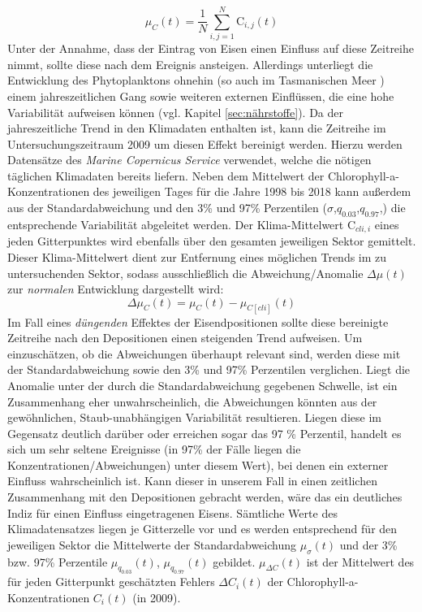 \documentclass[12pt,a4paper,onecolumn,headheight=30pt]{scrartcl}
\begin{document}
\begin{equation}
\mu_C(t) = \frac{1}{N}\sum\limits_{i,j=1}^{N} \text{C}_{i,j}(t)
\end{equation}
Unter der Annahme, dass der Eintrag von Eisen einen Einfluss auf diese Zeitreihe nimmt, sollte diese nach dem Ereignis ansteigen. Allerdings unterliegt die Entwicklung des Phytoplanktons ohnehin (so auch im Tasmanischen Meer \citep{Tilburg.2002}) einem jahreszeitlichen Gang sowie weiteren externen Einflüssen, die eine hohe Variabilität aufweisen können (vgl. Kapitel \ref{sec:nährstoffe}). Da der jahreszeitliche Trend in den Klimadaten enthalten ist, kann die Zeitreihe im Untersuchungszeitraum 2009 um diesen Effekt bereinigt werden. Hierzu werden Datensätze des \textit{Marine Copernicus Service} verwendet, welche die nötigen täglichen Klimadaten bereits liefern. Neben dem Mittelwert der Chlorophyll-a-Konzentrationen des jeweiligen Tages für die Jahre 1998 bis 2018 kann außerdem aus der Standardabweichung und den 3\% und 97\% Perzentilen ($\sigma$,$q_{0.03}$,$q_{0.97}$,) die entsprechende Variabilität abgeleitet werden. Der Klima-Mittelwert $\text{C}_{cli,i}$ eines jeden Gitterpunktes wird ebenfalls über den gesamten jeweiligen Sektor gemittelt. Dieser Klima-Mittelwert dient zur Entfernung eines möglichen Trends im zu untersuchenden Sektor, sodass ausschließlich die Abweichung/Anomalie $\Delta \mu(t)$ zur \textit{normalen} Entwicklung dargestellt wird:
\begin{equation}
\Delta \mu_C(t) = \mu_C(t) - \mu_{C[cli]}(t) \label{eq:cli_anomalie}
\end{equation} 
Im Fall eines \textit{düngenden} Effektes der Eisendpositionen sollte diese bereinigte Zeitreihe nach den Depositionen einen steigenden Trend aufweisen. Um einzuschätzen, ob die Abweichungen überhaupt relevant sind, werden diese mit der Standardabweichung sowie den 3\% und 97\% Perzentilen verglichen. Liegt die Anomalie unter der durch die Standardabweichung gegebenen Schwelle, ist ein Zusammenhang eher unwahrscheinlich, die Abweichungen könnten aus der gewöhnlichen, Staub-unabhängigen Variabilität resultieren. Liegen diese im Gegensatz deutlich darüber oder erreichen sogar das 97 \% Perzentil, handelt es sich um sehr seltene Ereignisse (in 97\% der Fälle liegen die Konzentrationen/Abweichungen) unter diesem Wert), bei denen ein externer Einfluss wahrscheinlich ist. Kann dieser in unserem Fall in einen zeitlichen Zusammenhang mit den Depositionen gebracht werden, wäre das ein deutliches Indiz für einen Einfluss eingetragenen Eisens. Sämtliche Werte des Klimadatensatzes liegen je Gitterzelle vor und es werden entsprechend für den jeweiligen Sektor die Mittelwerte der Standardabweichung $\mu_\sigma (t)$ und der 3\% bzw. 97\% Perzentile  $\mu_{q_{0.03}}(t)$, $\mu_{q_{0.97}}(t)$ gebildet. $\mu_{\Delta C}(t)$ ist der Mittelwert des für jeden Gitterpunkt geschätzten Fehlers $ \Delta C_i(t)$ der Chlorophyll-a-Konzentrationen $C_i(t)$ (in 2009).
\end{document}
